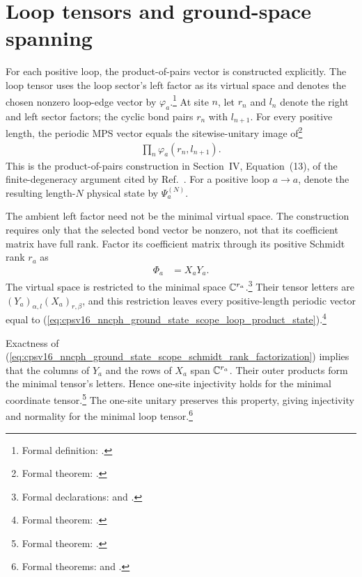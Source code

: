 \documentclass{article}
\begin{document}
\section{Loop tensors and ground-space spanning}

For each positive loop, the product-of-pairs vector is constructed explicitly.
The loop tensor uses the loop sector's left factor as its virtual space and
denotes the chosen nonzero loop-edge vector by $\varphi_a$.\footnote{Formal
definition: .} At site $n$,
let $r_n$ and $l_n$ denote the right and left sector factors; the cyclic bond
pairs $r_n$ with $l_{n+1}$. For every positive length, the periodic MPS vector
equals the sitewise-unitary image of\footnote{Formal theorem:
.}
\begin{align}
    \prod_n\varphi_a(r_n,l_{n+1}).
    \label{eq:cpsv16_nncph_ground_state_scope_loop_product_state}
\end{align}
This is the product-of-pairs construction in Section~IV, Equation~(13), of the
finite-degeneracy argument cited by Ref.~\cite{Cirac2016MPDO_arXiv}. For a
positive loop $a\to a$, denote the resulting length-$N$ physical state by
$\Psi_a^{(N)}$.

The ambient left factor need not be the minimal virtual space. The construction
requires only that the selected bond vector be nonzero, not that its
coefficient matrix have full rank. Factor its coefficient matrix through its
positive Schmidt rank $r_a$ as
\begin{align}
    \Phi_a
        &=X_aY_a.
    \label{eq:cpsv16_nncph_ground_state_scope_schmidt_rank_factorization}
\end{align}
The virtual space is restricted to the minimal space $\mathbb{C}^{r_a}$.\footnote{Formal
declarations: 
and .} Their tensor
letters are $(Y_a)_{\alpha,l}(X_a)_{r,\beta}$, and this restriction leaves every
positive-length periodic vector equal to
(\ref{eq:cpsv16_nncph_ground_state_scope_loop_product_state}).\footnote{Formal
theorem: .}

Exactness of
(\ref{eq:cpsv16_nncph_ground_state_scope_schmidt_rank_factorization}) implies
that the columns of $Y_a$ and the rows of $X_a$ span $\mathbb{C}^{r_a}$. Their outer
products form the minimal tensor's letters. Hence one-site injectivity holds
for the minimal coordinate tensor.\footnote{Formal theorem:
.}
The one-site unitary preserves this property, giving injectivity and normality
for the minimal loop tensor.\footnote{Formal theorems:
 and
.}
\end{document}
